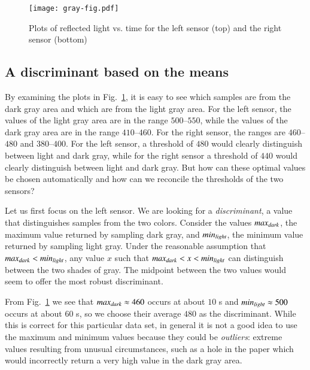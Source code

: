 \begin{figure}
\begin{center}
\texttt{[image: gray-fig.pdf]}
\end{center}
\caption{Plots of reflected light vs. time for the left sensor (top) and the right sensor (bottom)}\label{fig.closegrays2}
\end{figure}

\subsection{A discriminant based on the means}

By examining the plots in Fig.~\ref{fig.closegrays2}, it is easy to see which samples are from the dark gray area and which are from the light gray area. For the left sensor, the values of the light gray area are in the range $500$--$550$, while the values of the dark gray area are in the range $410$--$460$. For the right sensor, the ranges are $460$--$480$ and $380$--$400$. For the left sensor, a threshold of $480$ would clearly distinguish between light and dark gray, while for the right sensor a threshold of $440$ would clearly distinguish between light and dark gray. But how can these optimal values be chosen automatically and how can we reconcile the thresholds of the two sensors?

Let us first focus on the left sensor. We are looking for a \textit{discriminant}, a value that distinguishes samples from the two colors. Consider the values $\mathit{max}_{\textit{\scriptsize dark}}$, the maximum value returned by sampling dark gray, and $\mathit{min}_{\textit{\scriptsize light}}$, the minimum value returned by sampling light gray. Under the reasonable assumption that $\mathit{max}_{\textit{\scriptsize dark}} < \mathit{min}_{\textit{\scriptsize light}}$, any value $x$ such that $\mathit{max}_{\textit{\scriptsize dark}} < x < \mathit{min}_{\textit{\scriptsize light}}$ can distinguish between the two shades of gray. The midpoint between the two values would seem to offer the most robust discriminant.

From Fig.~\ref{fig.closegrays2} we see that $\mathit{max}_{\textit{\scriptsize dark}}\approx 460$ occurs at about $10$ s and $\mathit{min}_{\textit{\scriptsize light}}\approx 500$ occurs at about $60$ s, so we choose their average $480$ as the discriminant. While this is correct for this particular data set, in general it is not a good idea to use the maximum and minimum values because they could be \emph{outliers}: extreme values resulting from unusual circumstances, such as a hole in the paper which would incorrectly return a very high value in the dark gray area.

